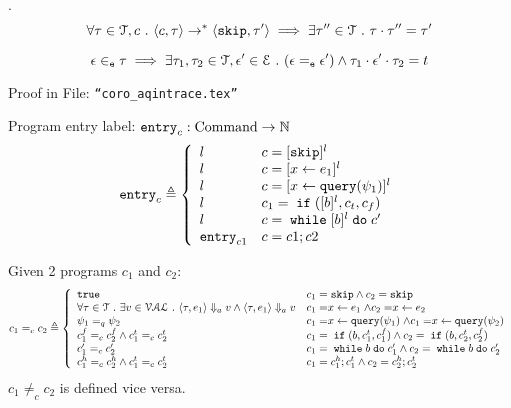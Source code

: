 %
\begin{lem}
.
\\
$$
\forall \mathtt{\tau} \in \mathcal{T}, c ~.~
\langle c, \mathtt{\tau} \rangle \rightarrow^{*} \langle \mathtt{skip}, \mathtt{\tau}' \rangle 
\implies \exists \mathtt{\tau}'' \in \mathcal{T} ~.~ \mathtt{\tau} \cdot \mathtt{\tau}'' = \mathtt{\tau}'
$$
\end{lem}
%
\begin{coro}
\label{coro:aqintrace}
\[
\mathtt{\epsilon} \in_{\mathtt{e}} \mathtt{\tau} \implies \exists \mathtt{\tau}_1, \mathtt{\tau}_2 \in \mathcal{T}, 
\mathtt{\epsilon}' \in \mathcal{E} ~.~ (\mathtt{\epsilon} =_{\mathtt{e}} \mathtt{\epsilon}') \land \mathtt{\tau}_1 \cdot \mathtt{\epsilon}' \cdot \mathtt{\tau}_2 = t  
\]
\end{coro}
\begin{subproof}
Proof in File: {\tt ``coro\_aqintrace.tex''}
% 
%
\end{subproof}
%
Program entry label: $\mathtt{entry}_c : \mbox{Command} \to \mathbb{N}$ 
\[
  \entry_c \triangleq 
\left\{
  \begin{array}{ll} 
     l       
    & c = [\eskip]{}^l
    \\ 
    l    & c = [\assign{x}{\expr_1}]{}^l
    \\ 
    l      
    & c = [\assign{x}{\query(\qexpr_1)}]{}^l
    \\
   l
    & c_1 = \eif([b]{}^l, c_t, c_f)
    \\ 
    l         
    & c = \ewhile [b]^l \edo c'
    \\ 
    \entry_{c1}
    & c = c1;c2
  \end{array}
  \right.
\]
%
\begin{defn}
%
\label{def:aq_prog}
Given 2 programs $c_1$ and $c_2$:
\[
c_1 =_{c} c_2
\triangleq 
\left\{
  \begin{array}{ll} 
    \etrue        
    & c_1 = \eskip \land c_2 = \eskip
    \\ 
    \forall \trace \in \mathcal{T} \st \exists v \in \mathcal{VAL}
    \st \config{ \trace, \expr_1} \aarrow v \land \config{ \trace, \expr_1} \aarrow v     
    & c_1 = \assign{x}{\expr_1} \land c_2 = \assign{x}{\expr_2} 
    \\ 
    \qexpr_1 =_{q} \qexpr_2       
    & c_1 = \assign{x}{\query(\qexpr_1)} \land c_1 = \assign{x}{\query(\qexpr_2)} 
    \\
    c_1^f =_{c} c_2^f \land c_1^t =_{c} c_2^t
    & c_1 = \eif(b, c_1^t, c_1^f) \land c_2 = \eif(b, c_2^t, c_2^f)
    \\ 
    c_1' =_{c} c_2'         
    & c_1 = \ewhile b \edo c_1' \land c_2 = \ewhile b \edo c_2'
    \\ 
    c_1^h =_{c} c_2^h \land c_1^t =_{c} c_2^t
    & c_1 = c_1^h;c_1^t \land c_2 = c_2^h;c_2^t 
  \end{array}
  \right.
\]
%
$c_1 \neq_{c} c_2$  is defined vice versa.
%
\end{defn}
